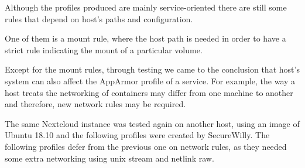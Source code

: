 Although the profiles produced are mainly service-oriented there are still some rules that depend on host's paths and configuration.

One of them is a mount rule, where the host path is needed in order to have a strict rule indicating the mount of a particular volume.

Except for the mount rules, through testing we came to the conclusion that host's system can also affect the AppArmor profile of a service. For example, the way a host treats the networking of containers may differ from one machine to another and therefore, new network rules may be required.

The same Nextcloud instance was tested again on another host, using an image of Ubuntu 18.10 and the following profiles were created by SecureWilly. The following profiles defer from the previous one on network rules, as they needed some extra networking using unix stream and netlink raw.

